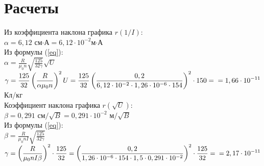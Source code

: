 \documentclass[12pt]{article}
\begin{document}
	\section{Расчеты}
	Из коэффициента наклона графика $r(1/I)$:\\
	$\displaystyle\alpha = 6,12$ см$\cdot$А$=6,12\cdot10^{-2}$м$\cdot$А\\
	Из формулы (\ref{eq}):\\
	$\displaystyle\alpha = \frac{R}{\mu_0n}\sqrt{\frac{125}{32\gamma}}\sqrt{U}$\\
	$\displaystyle\gamma=\frac{125}{32}\left(\frac{R}{\alpha\mu_0n}\right)^2U=\frac{125}{32}\left(\frac{0,2}{6,12\cdot10^{-2}\cdot1,26\cdot10^{-6}\cdot154}\right)^2\cdot 150=\\=1,66\cdot10^{-11}$Кл/кг\\
	Коэффициент наклона графика $r(\sqrt{U})$:\\
	$\displaystyle\beta=0,291$ см$/\sqrt{B}=0,291\cdot10^{-2}$ м$/\sqrt{B}$\\
	Из формулы (\ref{eq}):\\
	$\displaystyle\beta=\frac{R}{\mu_0nI}\sqrt{\frac{125}{32\gamma}}$\\
	$\displaystyle\gamma=\left( \frac{R}{\mu_0nI\beta}\right)^2\cdot\frac{125}{32}=\left(\frac{0,2}{1,26\cdot10^{-6}\cdot154\cdot1,5\cdot0,291\cdot10^{-2}}\right)^2\cdot\frac{125}{32}=\\=2,17\cdot10^{-11}$
\end{document}
